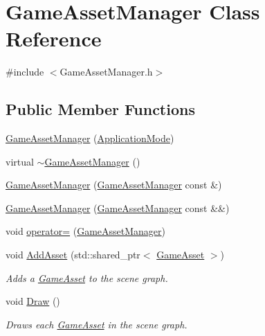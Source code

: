 \hypertarget{classGameAssetManager}{}\section{Game\+Asset\+Manager Class Reference}
\label{classGameAssetManager}


{\ttfamily \#include $<$Game\+Asset\+Manager.\+h$>$}

\subsection*{Public Member Functions}
\begin{DoxyCompactItemize}
\item 
\hyperlink{classGameAssetManager_aaa0d58e276cc10ad91a7457085598a71}{Game\+Asset\+Manager} (\hyperlink{common_8h_add86e7c88dd109abea3f708b422f31f0}{Application\+Mode})
\item 
virtual \hyperlink{classGameAssetManager_a1270bd61ecbcca563f079803e40c9b77}{$\sim$\+Game\+Asset\+Manager} ()
\item 
\hyperlink{classGameAssetManager_a2c9adcb72faa154c87eadc9bafe5269d}{Game\+Asset\+Manager} (\hyperlink{classGameAssetManager}{Game\+Asset\+Manager} const \&)
\item 
\hyperlink{classGameAssetManager_a44f6e2fd6b8ff1dd64e5697f1be7386d}{Game\+Asset\+Manager} (\hyperlink{classGameAssetManager}{Game\+Asset\+Manager} const \&\&)
\item 
void \hyperlink{classGameAssetManager_a7c9e4fce50b47b78652e7ff0b4dbb629}{operator=} (\hyperlink{classGameAssetManager}{Game\+Asset\+Manager})
\item 
void \hyperlink{classGameAssetManager_ad3de8ff00d55ba04728b1de8213b2349}{Add\+Asset} (std\+::shared\+\_\+ptr$<$ \hyperlink{classGameAsset}{Game\+Asset} $>$)
\begin{DoxyCompactList}\small\item\em Adds a \hyperlink{classGameAsset}{Game\+Asset} to the scene graph. \end{DoxyCompactList}\item 
void \hyperlink{classGameAssetManager_a32837132bd70a9a9ed537323c2d3d886}{Draw} ()
\begin{DoxyCompactList}\small\item\em Draws each \hyperlink{classGameAsset}{Game\+Asset} in the scene graph. \end{DoxyCompactList}\end{DoxyCompactItemize}


